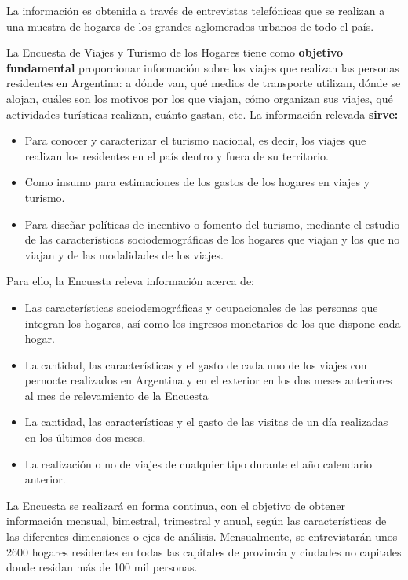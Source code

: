 \documentclass[
  openany]{book}
\begin{document}
La información es obtenida a través de entrevistas telefónicas que se realizan a una muestra de hogares de los grandes aglomerados urbanos de todo el país.

La Encuesta de Viajes y Turismo de los Hogares tiene como \textbf{objetivo fundamental} proporcionar información sobre los viajes que realizan las personas residentes en Argentina: a dónde van, qué medios de transporte utilizan, dónde se alojan, cuáles son los motivos por los que viajan, cómo organizan sus viajes, qué actividades turísticas realizan, cuánto gastan, etc. La información relevada \textbf{sirve:}

\begin{itemize}
\item
  Para conocer y caracterizar el turismo nacional, es decir, los viajes que realizan los residentes en el país dentro y fuera de su territorio.
\item
  Como insumo para estimaciones de los gastos de los hogares en viajes y turismo.
\item
  Para diseñar políticas de incentivo o fomento del turismo, mediante el estudio de las características sociodemográficas de los hogares que viajan y los que no viajan y de las modalidades de los viajes.
\end{itemize}

Para ello, la Encuesta releva información acerca de:

\begin{itemize}
\item
  Las características sociodemográficas y ocupacionales de las personas que integran los hogares, así como los ingresos monetarios de los que dispone cada hogar.
\item
  La cantidad, las características y el gasto de cada uno de los viajes con pernocte realizados en Argentina y en el exterior en los dos meses anteriores al mes de relevamiento de la Encuesta
\item
  La cantidad, las características y el gasto de las visitas de un día realizadas en los últimos dos meses.
\item
  La realización o no de viajes de cualquier tipo durante el año calendario anterior.
\end{itemize}

La Encuesta se realizará en forma continua, con el objetivo de obtener información mensual, bimestral, trimestral y anual, según las características de las diferentes dimensiones o ejes de análisis. Mensualmente, se entrevistarán unos 2600 hogares residentes en todas las capitales de provincia y ciudades no capitales donde residan más de 100 mil personas.
\end{document}
